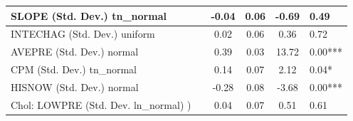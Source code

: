 \begin{table}
\begin{center}
\begin{tabular}{|l|l|c|c|c|l|}
			\hline
			SLOPE (Std. Dev.) tn_normal &  & -0.04 & 0.06 & -0.69 & 0.49 \\
			\hline
			INTECHAG (Std. Dev.) uniform &  & 0.02 & 0.06 & 0.36 & 0.72 \\
			\hline
			AVEPRE (Std. Dev.) normal &  & 0.39 & 0.03 & 13.72 & 0.00*** \\
			\hline
			CPM (Std. Dev.) tn_normal &  & 0.14 & 0.07 & 2.12 & 0.04* \\
			\hline
			HISNOW (Std. Dev.) normal &  & -0.28 & 0.08 & -3.68 & 0.00*** \\
			\hline
			 Chol: LOWPRE (Std. Dev. ln_normal) ) &  & 0.04 & 0.07 & 0.51 & 0.61 \\
			\hline
		\end{tabular}
	\end{center}
\end{table}